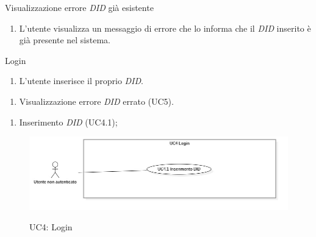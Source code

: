 \begin{usecase}{3}{Visualizzazione errore \textit{DID} già esistente}\label{uc:registrazione-did-esistente}
  \usecasemain{}
  
  \begin{enumerate}
    \item L'utente visualizza un messaggio di errore che lo informa che il \textit{DID} inserito è già presente nel sistema.
  \end{enumerate}
\end{usecase}

\begin{usecase}{4}{Login}\label{uc:autenticazione}
  \usecasemain{}
  
  \begin{enumerate}
    \item L'utente inserisce il proprio \textit{DID}.\@
  \end{enumerate}

  \usecaseext{}
  \begin{enumerate}
    \item Visualizzazione errore \textit{DID} errato (UC5).
  \end{enumerate}

  \begin{enumerate}
    \item Inserimento \textit{DID} (UC4.1);
  \end{enumerate}
\end{usecase}

\begin{figure}[!ht] 
  \centering 
  \includegraphics[width=0.9\columnwidth, alt={Caso d'uso relativo all'autenticazione dell'utente}]{immagini/usecase/UC4.jpg}
  \caption{UC4: Login}\label{fig:uc:autenticazione}
\end{figure}

